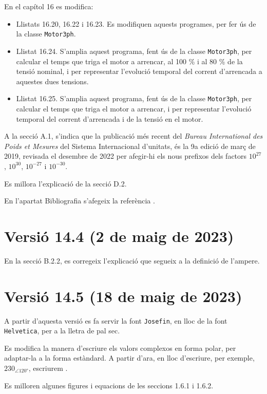 En el capítol 16 es modifica:
\begin{itemize}
	\item Llistats 16.20, 16.22 i 16.23. Es modifiquen aquests programes, per fer ús de la classe \texttt{Motor3ph}.
	\item Llistat 16.24. S'amplia aquest programa, fent ús de la classe \texttt{Motor3ph}, per  calcular el temps que triga el motor a arrencar, al 100 \% i al 80 \% de la tensió nominal, i per representar l'evolució temporal del corrent d'arrencada a aquestes dues tensions.
	\item  Llistat 16.25. S'amplia aquest programa, fent ús de la classe \texttt{Motor3ph}, per  calcular el temps que triga el motor a arrencar, i per representar l'evolució temporal del  corrent d'arrencada i de la tensió en el motor.
\end{itemize}

A la secció A.1, s'indica que la publicació més recent del \textit{Bureau 	International des Poids et Mesures} del Sistema Internacional d'unitats, és la  9a edició de març de 2019, revisada el desembre de 2022 per afegir-hi els nous prefixos dels factors $10^{27}$,  $10^{30}$,  $10^{-27}$ i  $10^{-30}$.

Es millora l'explicació de la secció D.2.

En l'apartat Bibliografia s'afegeix la referència \cite{ALL}.

\section*{Versió 14.4 (2 de maig de 2023)}

En la secció B.2.2, es corregeix l'explicació que segueix a la definició de l'ampere.

\section*{Versió 14.5 (18 de maig de 2023)}

A partir d'aquesta versió es fa servir la font \texttt{Josefin}, en lloc de la font \texttt{Helvetica},  per a la lletra de pal sec.

Es modifica  la manera d'escriure els valors complexos en forma polar, per adaptar-la a la forma estàndard. A partir d'ara, en lloc d'escriure, per exemple, $230_{\angle\ang{120}}$, escriurem .

Es milloren algunes figures i equacions de les seccions 1.6.1 i 1.6.2.

